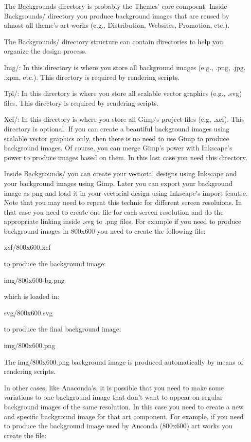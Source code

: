 The Backgrounds directory is probably the Themes' core compoent.
Inside Backgrounds/ directory you produce background images that are
reused by almost all theme's art works (e.g., Distribution, Websites,
Promotion, etc.).  

The Backgrounds/ directory structure can contain directories to help
you organize the design process. 

    Img/: In this directory is where you store all background images
          (e.g., .png, .jpg, .xpm, etc.).  This directory is required
          by rendering scripts.

    Tpl/: In this directory is where you store all scalable vector
          graphics (e.g., .svg) files. This directory is required by
          rendering scripts.

    Xcf/: In this directory is where you store all Gimp's project
          files (e.g, .xcf). This directory is optional. If you can
          create a beautiful background images using scalable vector
          graphics only, then there is no need to use Gimp to produce
          background images. Of course, you can merge Gimp's power
          with Inkscape's power to produce images based on them.  In
          this last case you need this directory.

Inside Backgrounds/ you can create your vectorial designs using
Inkscape and your background images using Gimp. Later you can export
your background image as png and load it in your vectorial design
using Inkscape's import feautre.  Note that you may need to repeat
this technic for different screen resoluions. In that case you need to
create one file for each screen resolution and do the appropriate
linking inside .svg to .png files.  For example if you need to produce
background images in 800x600 you need to create the following file:

    xcf/800x600.xcf

to produce the background image:

    img/800x600-bg.png

which is loaded in: 

    svg/800x600.svg

to produce the final background image:

    img/800x600.png         

The img/800x600.png background image is produced automatically by
means of rendering scripts.

In other cases, like Anaconda's, it is possible that you need to make
some variations to one background image that don't want to appear on
regular background images of the same resolution. In this case you
need to create a new and specific background image for that art
component.  For example, if you need to produce the background image
used by Anconda (800x600) art works you create the file:

